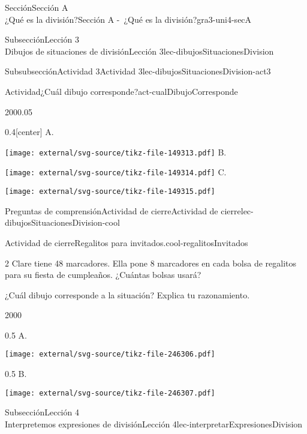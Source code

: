 \begin{sectionptx}{Sección}{{\Large Sección A\\}¿Qué es la división?}{}{Sección A -~¿Qué es la división?}{}{}{gra3-uni4-secA}
\begin{subsectionptx}{Subsección}{{\normalsize Lección 3\\[-0.05cm]}Dibujos de situaciones de división}{}{Lección 3}{}{}{lec-dibujosSituacionesDivision}
\begin{subsubsectionptx}{Subsubsección}{Actividad 3}{}{Actividad 3}{}{}{lec-dibujosSituacionesDivision-act3}
\begin{activity}{Actividad}{¿Cuál dibujo corresponde?}{act-cualDibujoCorresponde}
\begin{sidebyside}{2}{0}{0}{0.05}
\begin{sbspanel}{0.4}[center]
A.%
\par
\texttt{[image: external/svg-source/tikz-file-149313.pdf]}
B.%
\par
\texttt{[image: external/svg-source/tikz-file-149314.pdf]}
C.%
\par
\texttt{[image: external/svg-source/tikz-file-149315.pdf]}
\end{sbspanel}%
\end{sidebyside}%
\end{activity}%
\end{subsubsectionptx}
%
%
\typeout{************************************************}
\typeout{************************************************}
%
\begin{reading-questions-subsubsection}{Preguntas de comprensión}{Actividad de cierre}{}{Actividad de cierre}{}{}{lec-dibujosSituacionesDivision-cool}
\begin{project}{Actividad de cierre}{Regalitos para invitados.}{cool-regalitosInvitados}%
\begin{multicols}{2}
Clare tiene 48 marcadores. Ella pone 8 marcadores en cada bolsa de regalitos para su fiesta de cumpleaños. ¿Cuántas bolsas usará?%
\par
¿Cuál dibujo corresponde a la situación? Explica tu razonamiento.%
\vfill\columnbreak
\begin{sidebyside}{2}{0}{0}{0}%
\begin{sbspanel}{0.5}%
A.%
\par
\texttt{[image: external/svg-source/tikz-file-246306.pdf]}
\end{sbspanel}%
\begin{sbspanel}{0.5}%
B.%
\par
\texttt{[image: external/svg-source/tikz-file-246307.pdf]}
\end{sbspanel}%
\end{sidebyside}%
\end{multicols}
\end{project}%
\end{reading-questions-subsubsection}
\end{subsectionptx}
%
%
\typeout{************************************************}
\typeout{************************************************}
%
\begin{subsectionptx}{Subsección}{{\normalsize Lección 4\\[-0.05cm]}Interpretemos expresiones de división}{}{Lección 4}{}{}{lec-interpretarExpresionesDivision}

\end{subsectionptx}
\end{sectionptx}
